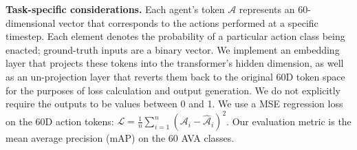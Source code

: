 \medskip \noindent \textbf{Task-specific considerations.} Each agent's token $\mathcal{A}$ represents an 60-dimensional vector that corresponds to the actions performed at a specific timestep. Each element denotes the probability of a particular action class being enacted; ground-truth inputs are a binary vector. We implement an embedding layer that projects these tokens into the transformer's hidden dimension, as well as an un-projection layer that reverts them back to the original 60D token space for the purposes of loss calculation and output generation. We do not explicitly require the outputs to be values between 0 and 1.
We use a MSE regression loss on the 60D action tokens: $\mathscr{L} = \frac{1}{n} \sum_{i=1}^{n} (\mathcal{A}_i - \hat{\mathcal{A}}_i)^2$.
Our evaluation metric is the
mean average precision (mAP) on the 60 AVA classes.

